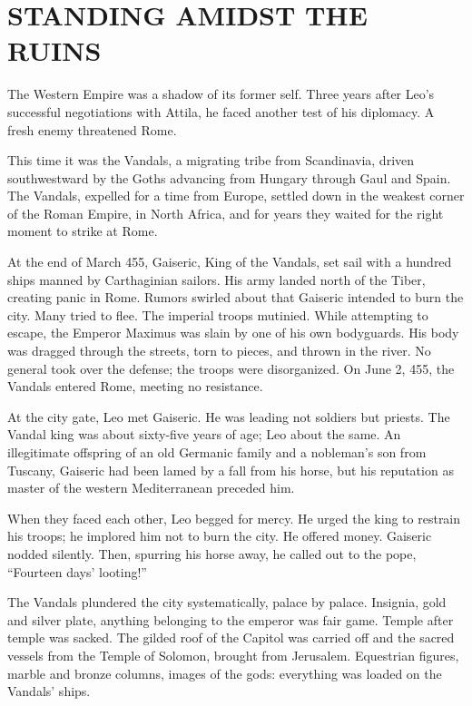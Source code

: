 \section{STANDING AMIDST THE RUINS}

The Western Empire was a shadow of its former self. Three years after Leo’s successful negotiations
with Attila, he faced another test of his diplomacy. A fresh enemy threatened Rome.

This time it was the Vandals, a migrating tribe from Scandinavia, driven southwestward by the Goths
advancing from Hungary through Gaul and Spain. The Vandals, expelled for a time from Europe, settled
down in the weakest corner of the Roman Empire, in North Africa, and for years they waited for the
right moment to strike at Rome.

At the end of March 455, Gaiseric, King of the Vandals, set sail with a hundred ships manned by
Carthaginian sailors. His army landed north of the Tiber, creating panic in Rome. Rumors swirled
about that Gaiseric intended to burn the city. Many tried to flee. The imperial troops mutinied.
While attempting to escape, the Emperor Maximus was slain by one of his own bodyguards. His body was
dragged through the streets, torn to pieces, and thrown in the river. No general took over the
defense; the troops were disorganized. On June 2, 455, the Vandals entered Rome, meeting no
resistance.

At the city gate, Leo met Gaiseric. He was leading not soldiers but priests. The Vandal king was
about sixty-five years of age; Leo about the same. An illegitimate offspring of an old Germanic
family and a nobleman’s son from Tuscany, Gaiseric had been lamed by a fall from his horse, but his
reputation as master of the western Mediterranean preceded him.

When they faced each other, Leo begged for mercy. He urged the king to restrain his troops; he
implored him not to burn the city. He offered money. Gaiseric nodded silently. Then, spurring his
horse away, he called out to the pope, “Fourteen days’ looting!”

The Vandals plundered the city systematically, palace by palace. Insignia, gold and silver plate,
anything belonging to the emperor was fair game. Temple after temple was sacked. The gilded roof of
the Capitol was carried off and the sacred vessels from the Temple of Solomon, brought from
Jerusalem. Equestrian figures, marble and bronze columns, images of the gods: everything was loaded
on the Vandals’ ships.

